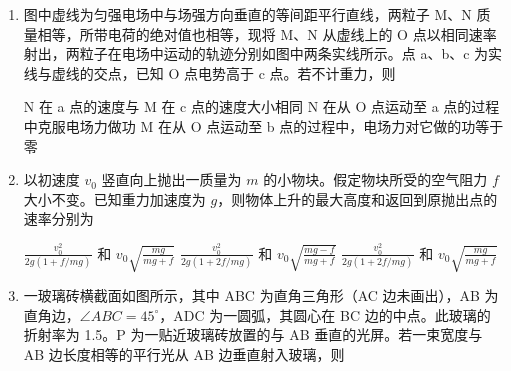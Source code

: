 \documentclass[\gkver]{gaokaozhenti}
\begin{document}
\begin{enumerate}
\item
图中虚线为匀强电场中与场强方向垂直的等间距平行直线，两粒子 M、N 质量相等，所带电荷的绝对值也相等，现将 M、N 从虚线上的 O 点以相同速率射出，两粒子在电场中运动的轨迹分别如图中两条实线所示。点 a、b、c 为实线与虚线的交点，已知 O 点电势高于 c 点。若不计重力，则


{N 在 a 点的速度与 M 在 c 点的速度大小相同}
{N 在从 O 点运动至 a 点的过程中克服电场力做功}
{M 在从 O 点运动至 b 点的过程中，电场力对它做的功等于零}


\item
以初速度 $v_{0}$ 竖直向上抛出一质量为 $m$ 的小物块。假定物块所受的空气阻力 $f$ 大小不变。已知重力加速度为 $g$，则物体上升的最大高度和返回到原抛出点的速率分别为

{$\frac{v_{0}^{2}}{2g(1+f/mg)}$ 和 $v_{0}\sqrt{\frac{mg}{mg+f}}$}
{$\frac{v_{0}^{2}}{2g(1+2f/mg)}$ 和 $v_{0}\sqrt{\frac{mg-f}{mg+f}}$}
{$\frac{v_{0}^{2}}{2g(1+2f/mg)}$ 和 $v_{0}\sqrt{\frac{mg}{mg+f}}$}


\item
一玻璃砖横截面如图所示，其中 ABC 为直角三角形（AC 边未画出），AB 为直角边，$\angle ABC=45^\circ$，ADC 为一圆弧，其圆心在 BC 边的中点。此玻璃的折射率为 1.5。P 为一贴近玻璃砖放置的与 AB 垂直的光屏。若一束宽度与 AB 边长度相等的平行光从 AB 边垂直射入玻璃，则


\end{enumerate}
\end{document}
